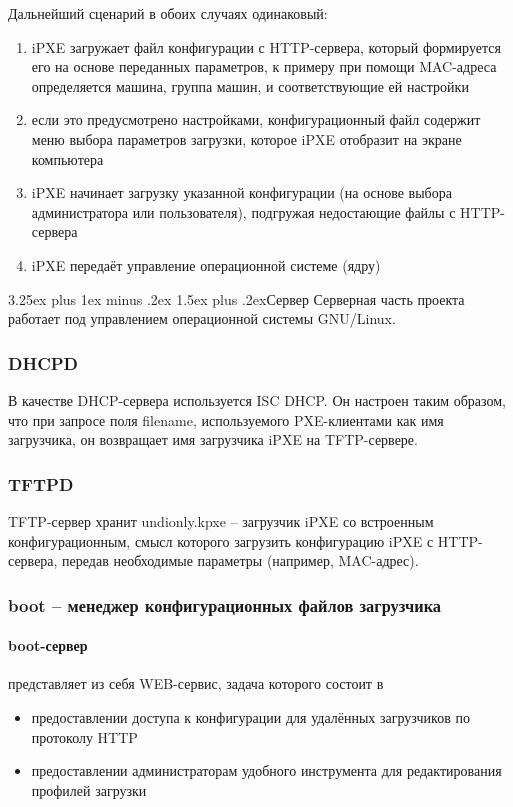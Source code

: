 \documentclass[11pt]{article}
\makeatletter
\renewcommand{\subsection}{\@startsection{subsection}{2}%
{\parindent}{3.25ex plus 1ex minus .2ex}%
{1.5ex plus .2ex}{\bfseries}}
\makeatother
\begin{document}
Дальнейший сценарий в обоих случаях одинаковый:
\begin{enumerate}
    \item iPXE загружает файл конфигурации с HTTP-сервера,
        который формируется его на основе переданных параметров,
        к примеру при помощи MAC-адреса определяется машина,
        группа машин, и соответствующие ей настройки
    \item если это предусмотрено настройками,
        конфигурационный файл содержит меню выбора параметров загрузки,
        которое iPXE отобразит на экране компьютера
    \item iPXE начинает загрузку указанной конфигурации (на основе выбора администратора
        или пользователя), подгружая недостающие файлы с HTTP-сервера
    \item iPXE передаёт управление операционной системе (ядру)
\end{enumerate}

\subsection{Сервер}
Серверная часть проекта работает под управлением операционной
системы GNU/Linux.

\subsubsection{DHCPD}
В качестве DHCP-сервера используется ISC DHCP.
Он настроен таким образом, что при запросе поля
filename, используемого PXE-клиентами как имя
загрузчика, он возвращает имя загрузчика iPXE
на TFTP-сервере.

\subsubsection{TFTPD}
TFTP-сервер хранит undionly.kpxe -- загрузчик iPXE
со встроенным конфигурационным, смысл которого загрузить
конфигурацию iPXE с HTTP-сервера, передав необходимые параметры
(например, MAC-адрес).

\subsubsection{boot -- менеджер конфигурационных файлов загрузчика}

\paragraph{boot-сервер} представляет из себя WEB-сервис, задача которого состоит в
\begin{itemize}
    \item предоставлении доступа к конфигурации для удалённых загрузчиков по протоколу HTTP
    \item предоставлении администраторам удобного инструмента для редактирования профилей загрузки
\end{itemize}
\end{document}
